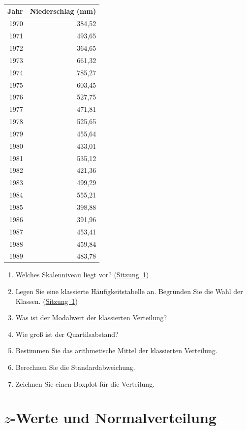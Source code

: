 \documentclass[
  11pt,
  ngerman,
  a4paper,
]{report}
\providecommand{\tightlist}{%
  \setlength{\itemsep}{0pt}\setlength{\parskip}{0pt}}
\begin{document}
\begin{table}[H]
\centering
\begin{tabular}{rr}
\toprule
Jahr & Niederschlag (mm)\\
\midrule
1970 & 384,52\\
1971 & 493,65\\
1972 & 364,65\\
1973 & 661,32\\
1974 & 785,27\\
1975 & 603,45\\
1976 & 527,75\\
1977 & 471,81\\
1978 & 525,65\\
1979 & 455,64\\
1980 & 433,01\\
1981 & 535,12\\
1982 & 421,36\\
1983 & 499,29\\
1984 & 555,21\\
1985 & 398,88\\
1986 & 391,96\\
1987 & 453,41\\
1988 & 459,84\\
1989 & 483,78\\
\bottomrule
\end{tabular}
\end{table}

\begin{enumerate}
\def\labelenumi{\alph{enumi})}
\tightlist
\item
  Welches Skalenniveau liegt vor? (\protect\hyperlink{skalenniveaus}{Sitzung~1})
\item
  Legen Sie eine klassierte Häufigkeitstabelle an. Begründen Sie die Wahl der Klassen. (\protect\hyperlink{quantitative-variablen-1}{Sitzung~1})
\item
  Was ist der Modalwert der klassierten Verteilung?
\item
  Wie groß ist der Quartilsabstand?
\item
  Bestimmen Sie das arithmetische Mittel der klassierten Verteilung.
\item
  Berechnen Sie die Standardabweichung.
\item
  Zeichnen Sie einen Boxplot für die Verteilung.
\end{enumerate}

\hypertarget{z-werte-und-normalverteilung}{%
\chapter{\texorpdfstring{\(z\)-Werte und Normalverteilung}{z-Werte und Normalverteilung}}\label{z-werte-und-normalverteilung}}
\end{document}
